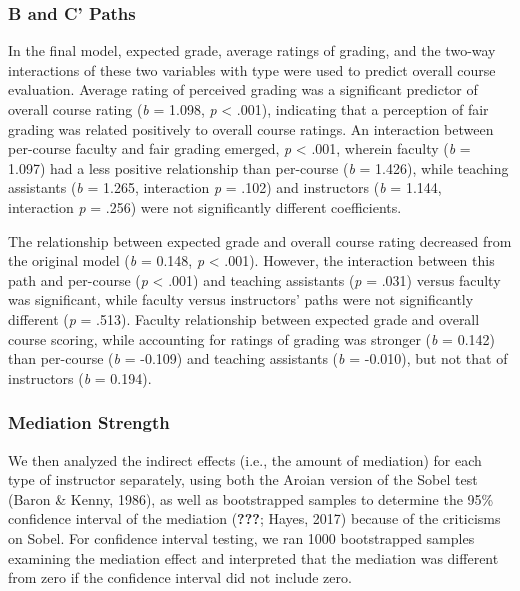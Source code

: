 \documentclass[,man]{apa6}
\theoremstyle{definition}
\theoremstyle{definition}
\theoremstyle{definition}
\theoremstyle{remark}
\begin{document}
\hypertarget{b-and-c-paths}{%
\subsubsection{B and C' Paths}\label{b-and-c-paths}}

In the final model, expected grade, average ratings of grading, and the
two-way interactions of these two variables with type were used to
predict overall course evaluation. Average rating of perceived grading
was a significant predictor of overall course rating (\emph{b} = 1.098,
\emph{p} \textless{} .001), indicating that a perception of fair grading
was related positively to overall course ratings. An interaction between
per-course faculty and fair grading emerged, \emph{p} \textless{} .001,
wherein faculty (\emph{b} = 1.097) had a less positive relationship than
per-course (\emph{b} = 1.426), while teaching assistants (\emph{b} =
1.265, interaction \emph{p} = .102) and instructors (\emph{b} = 1.144,
interaction \emph{p} = .256) were not significantly different
coefficients.

The relationship between expected grade and overall course rating
decreased from the original model (\emph{b} = 0.148, \emph{p}
\textless{} .001). However, the interaction between this path and
per-course (\emph{p} \textless{} .001) and teaching assistants (\emph{p}
= .031) versus faculty was significant, while faculty versus
instructors' paths were not significantly different (\emph{p} = .513).
Faculty relationship between expected grade and overall course scoring,
while accounting for ratings of grading was stronger (\emph{b} = 0.142)
than per-course (\emph{b} = -0.109) and teaching assistants (\emph{b} =
-0.010), but not that of instructors (\emph{b} = 0.194).

\hypertarget{mediation-strength}{%
\subsubsection{Mediation Strength}\label{mediation-strength}}

We then analyzed the indirect effects (i.e., the amount of mediation)
for each type of instructor separately, using both the Aroian version of
the Sobel test (Baron \& Kenny, 1986), as well as bootstrapped samples
to determine the 95\% confidence interval of the mediation
({\textbf{???}}; Hayes, 2017) because of the criticisms on Sobel. For
confidence interval testing, we ran 1000 bootstrapped samples examining
the mediation effect and interpreted that the mediation was different
from zero if the confidence interval did not include zero.
\end{document}
